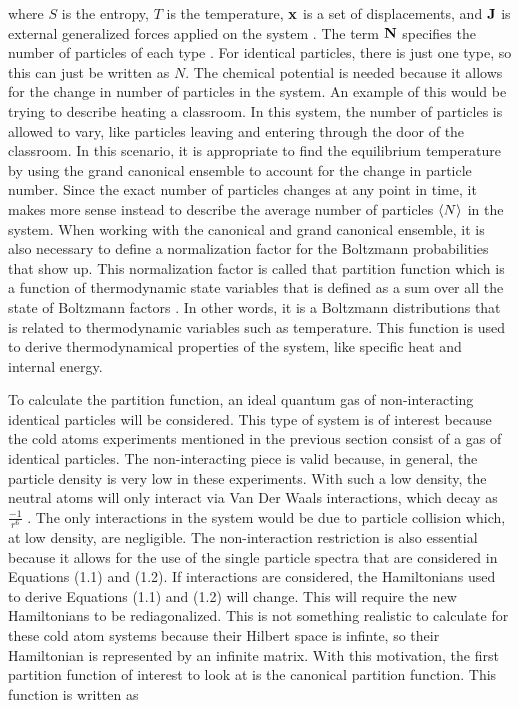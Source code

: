 where $S$ is the entropy, $T$ is the temperature, $\bold{x}$ is a set of displacements, and $\bold{J}$ is external generalized forces applied on the system \cite{Kardar}. The term $\bold{N}$ specifies the number of particles of each type \cite{Kardar}. For identical particles, there is just one type, so this can just be written as $N$. The chemical potential is needed because it allows for the change in number of particles in the system. An example of this would be trying to describe heating a classroom. In this system, the number of particles is allowed to vary, like particles leaving and entering through the door of the classroom. In this scenario, it is appropriate to find the equilibrium temperature by using the grand canonical ensemble to account for the change in particle number. Since the exact number of particles changes at any point in time, it makes more sense instead to describe the average number of particles $\left<{N}\right>$ in the system. When working with the canonical and grand canonical ensemble, it is also necessary to 
define a normalization factor for the Boltzmann probabilities that show up. This normalization factor is called that partition function which is a function of thermodynamic state variables that is defined as a sum over all the state of Boltzmann factors \cite{Blundell}. In other words, it is a Boltzmann distributions that is related to thermodynamic variables such as temperature. This function is used to derive thermodynamical properties of the system, like specific heat and internal energy.

To calculate the partition function, an ideal quantum gas of non-interacting identical particles will be considered. This type of system is of interest because the cold atoms experiments mentioned in the previous section consist of a gas of identical particles. The non-interacting piece is valid because, in general, the particle density is very low in these experiments. With such a low density, the neutral atoms will only interact via Van Der Waals interactions, which decay as $\frac{-1}{r^6}$ \cite{Kardar,Lebellac}. The only interactions in the system would be due to particle collision which, at low density, are negligible. The non-interaction restriction is also essential because it allows for the use of the single particle spectra that are considered in Equations (1.1) and (1.2). If interactions are considered, the Hamiltonians used to derive Equations (1.1) and (1.2) will change. This will require the new Hamiltonians to be rediagonalized. This is not something realistic to calculate for these cold atom systems because their Hilbert space is infinte, so their Hamiltonian is represented by an infinite matrix. 
With this motivation, the first partition function of interest to look at is the canonical partition function. This function is written as 

